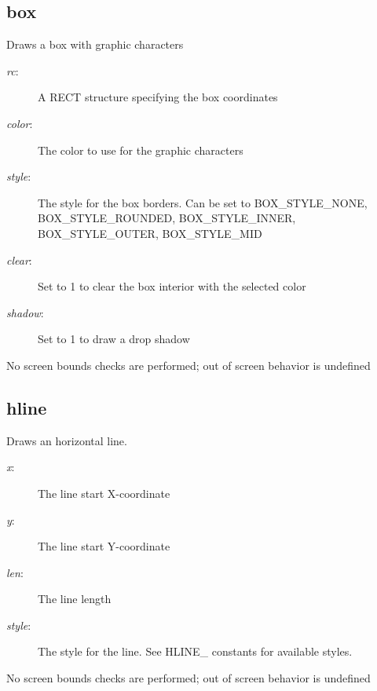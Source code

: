 \subsection{box}
\begin{description}[leftmargin=2cm,style=nextline]
\item [Description:] {Draws a box with graphic characters}
\item [Syntax:] 
\item [Parameters:]
\begin{description}\item[]
\item [{\em rc}:] {A RECT structure specifying the box coordinates}
\item [{\em color}:] {The color to use for the graphic characters}
\item [{\em style}:] {The style for the box borders. Can be set to BOX\_STYLE\_NONE, BOX\_STYLE\_ROUNDED, BOX\_STYLE\_INNER, BOX\_STYLE\_OUTER, BOX\_STYLE\_MID }
\item [{\em clear}:] {Set to 1 to clear the box interior with the selected color}
\item [{\em shadow}:] {Set to 1 to draw a drop shadow}
\end{description}
\item [Notes:] {No screen bounds checks are performed; out of screen behavior is undefined }
\end{description}

\subsection{hline}
\begin{description}[leftmargin=2cm,style=nextline]
\item [Description:] {Draws an horizontal line.}
\item [Syntax:] 
\item [Parameters:]
\begin{description}\item[]
\item [{\em x}:] {The line start X-coordinate}
\item [{\em y}:] {The line start Y-coordinate}
\item [{\em len}:] {The line length}
\item [{\em style}:] {The style for the line. See HLINE\_ constants for available styles. }
\end{description}
\item [Notes:] {No screen bounds checks are performed; out of screen behavior is undefined }
\end{description}

